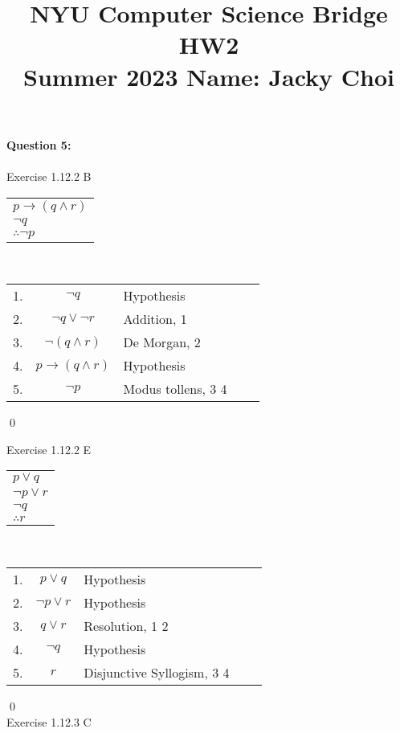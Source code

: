 \documentclass[11pt]{article}
\title{\textbf{NYU Computer Science Bridge HW2}\\
Summer 2023 Name: Jacky Choi}
\date{}
\begin{document}
\setul{}{2pt}

\maketitle

\noindent \textbf{Question 5:}\\\\
Exercise 1.12.2 B 
\begin{center}
  \begin{tabular}{l}
    $p \rightarrow (q \wedge r)$\\
  	$\neg q$\\
	\hline
   $ \therefore \neg p$\\
  \end{tabular} \\
 \begin{center}
  \begin{tabular}{lclcl}
1.& $\neg q$ & Hypothesis\\
2.& $\neg q \vee \neg r$ & Addition, 1\\
3.& $\neg (q \wedge r)$ & De Morgan, 2\\
4.& $ p \rightarrow (q \wedge r) $ & Hypothesis\\
5.& $\neg p$& Modus tollens, 3 4\\ 

  \end{tabular}
\end{center}
\end{center}
\qed 


\noindent Exercise 1.12.2 E
\begin{center}
  \begin{tabular}{l}
    $p \vee q$\\
  $ \neg p \vee r$\\
    $  \neg q$\\
    \hline
   $ \therefore r$\\
  \end{tabular}\\
  \begin{center}
   \begin{tabular}{lclcl}
1.& $p \vee q$ & Hypothesis\\
2.& $\neg p \vee r$ & Hypothesis\\
3.& $q \vee r$ &Resolution, 1 2\\
4.& $ \neg q$ & Hypothesis\\
5.& $r$& Disjunctive Syllogism, 3 4\\
  \end{tabular}
\end{center}
\end{center}
\qed
\pagebreak\\
\noindent Exercise 1.12.3 C\\
\end{document}
